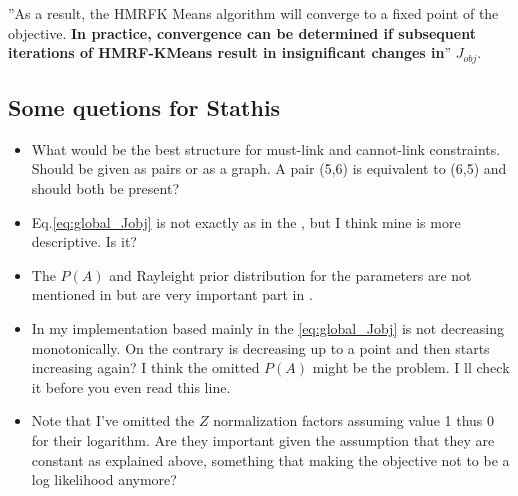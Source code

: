 \documentclass[dvips,dvipdfm,pdftex]{llncs}
\begin{document}
''As a result, the HMRFK Means algorithm will converge to a fixed point of the objective. \textbf{In practice, convergence can be determined if subsequent iterations of HMRF-KMeans result in insignificant changes in}'' $J_{obj}$.

\subsection{Some quetions for Stathis}
\begin{itemize}
	\item What would be the best structure for must-link and cannot-link constraints. Should be given as pairs or as a graph. A pair (5,6) is equivalent to (6,5) and should both be present?
	\item Eq.\ref{eq:global_Jobj} is not exactly as in the \cite{chapelle2006semi_hmrf_kmeans}, but I think mine is more descriptive. Is it?
	\item The $P(A)$ and Rayleight prior distribution for the parameters are not mentioned in \cite{basu2004probabilistic} but are very important part in \cite{chapelle2006semi_hmrf_kmeans}.
	\item In my implementation based mainly in \cite{basu2004probabilistic} the \ref{eq:global_Jobj} is not decreasing monotonically. On the contrary is decreasing up to a point and then starts increasing again? I think the omitted $P(A)$ might be the problem. I ll check it before you even read this line.
	\item Note that I've omitted the $Z$ normalization factors assuming value 1 thus 0 for their logarithm. Are they important given the assumption that they are constant as explained above, something that making the objective not to be a log likelihood anymore?
\end{itemize}



\end{document}
